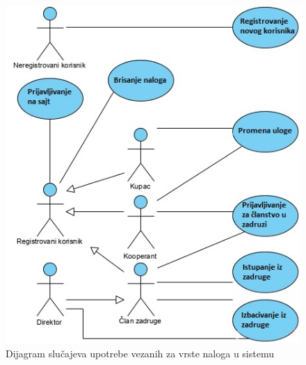 \documentclass[a4paper]{article}
\begin{document}
\begin{figure}[h!]
    \centering
    \includegraphics{images/clanstvoSU.jpg}
    \caption{Dijagram slučajeva upotrebe vezanih za vrste naloga u sistemu}
    \label{slika1}
\end{figure}
\end{document}
